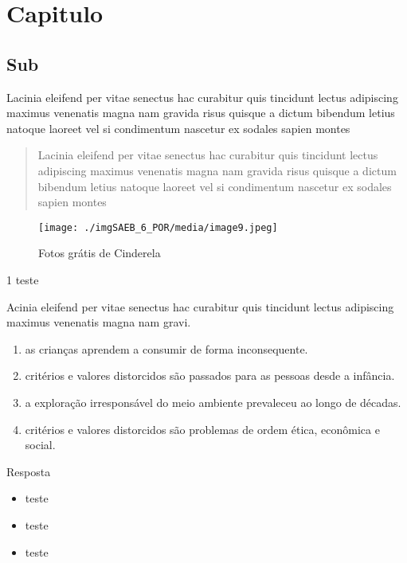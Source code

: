 \hypertarget{capitulo}{%
\section{Capitulo}\label{capitulo}}

\hypertarget{sub}{%
\subsection{Sub}\label{sub}}

Lacinia eleifend per vitae senectus hac curabitur quis tincidunt lectus
adipiscing maximus venenatis magna nam gravida risus quisque a dictum
bibendum letius natoque laoreet vel si condimentum nascetur ex sodales
sapien montes

\begin{quote}
Lacinia eleifend per vitae senectus hac curabitur quis tincidunt lectus
adipiscing maximus venenatis magna nam gravida risus quisque a dictum
bibendum letius natoque laoreet vel si condimentum nascetur ex sodales
sapien montes
\end{quote}



\begin{figure}
\centering
\texttt{[image: ./imgSAEB\_6\_POR/media/image9.jpeg]}
\caption{Fotos grátis de Cinderela}
\end{figure}


\num{1} teste

Acinia eleifend per vitae senectus hac curabitur quis tincidunt lectus
adipiscing maximus venenatis magna nam gravi.

\begin{enumerate}
\def\labelenumi{\arabic{enumi}.}
\item
  as crianças aprendem a consumir de forma inconsequente.
\item
  critérios e valores distorcidos são passados para as pessoas desde a
  infância.
\item
  a exploração irresponsável do meio ambiente prevaleceu ao longo de
  décadas.
\item
  critérios e valores distorcidos são problemas de ordem ética,
  econômica e social.
\end{enumerate}

Resposta

\begin{itemize}
\tightlist
\item
  teste
\item
  teste
\item
  teste
\end{itemize}
